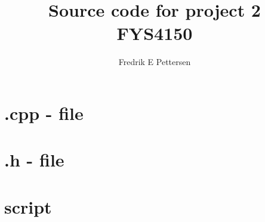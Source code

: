 \documentclass[a4paper,english, 10pt, twoside]{article}
\title{Source code for project 2\\ FYS4150}
\author{Fredrik E Pettersen}
\begin{document}
\maketitle

\section*{.cpp - file}

\section*{.h - file}

\section*{script}

\end{document}
